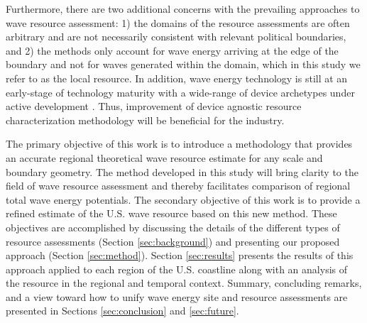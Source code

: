 Furthermore, there are two additional concerns with the prevailing approaches to wave resource assessment: 1) the domains of the resource assessments are often arbitrary and are not necessarily consistent with relevant political boundaries, and 2) the methods only account for wave energy arriving at the edge of the boundary and not for waves generated within the domain, which in this study we refer to as the local resource. In addition, wave energy technology is still at an early-stage of technology maturity with a wide-range of device archetypes under active development \citep{babaritOceanWaveEnergy2017}. Thus, improvement of device agnostic resource characterization methodology will be beneficial for the industry.

The primary objective of this work is to introduce a methodology that provides an accurate regional theoretical wave resource estimate for any scale and boundary geometry. The method developed in this study will bring clarity to the field of wave resource assessment and thereby facilitates comparison of regional total wave energy potentials. The secondary objective of this work is to provide a refined estimate of the U.S. wave resource based on this new method. These objectives are accomplished by discussing the details of the different types of resource assessments (Section \ref{sec:background}) and presenting our proposed approach (Section \ref{sec:method}). Section \ref{sec:results} presents the results of this approach applied to each region of the U.S. coastline along with an analysis of the resource in the regional and temporal context. Summary, concluding remarks, and a view toward how to unify wave energy site and resource assessments are presented in Sections \ref{sec:conclusion} and \ref{sec:future}.
